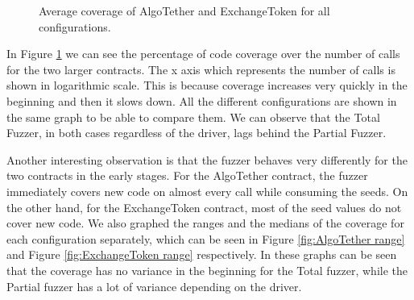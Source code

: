 \begin{figure}[htbp]
    \centering
    \hfill
    \caption{Average coverage of AlgoTether and ExchangeToken for all configurations.}
    \label{fig:percent_coverage}
\end{figure}

In Figure \ref{fig:percent_coverage} we can see the percentage of code coverage over the number of calls for the two larger contracts.
The x axis which represents the number of calls is shown in logarithmic scale.
This is because coverage increases very quickly in the beginning and then it slows down.
All the different configurations are shown in the same graph to be able to compare them.
We can observe that the Total Fuzzer, in both cases regardless of the driver, lags behind the Partial Fuzzer.

Another interesting observation is that the fuzzer behaves very differently for the two contracts in the early stages.
For the AlgoTether contract, the fuzzer immediately covers new code on almost every call while consuming the seeds.
On the other hand, for the ExchangeToken contract, most of the seed values do not cover new code.
We also graphed the ranges and the medians of the coverage for each configuration separately, which can be seen in Figure \ref{fig:AlgoTether range} and Figure \ref{fig:ExchangeToken range} respectively.
In these graphs can be seen that the coverage has no variance in the beginning for the Total fuzzer, while the Partial fuzzer has a lot of variance depending on the driver.

